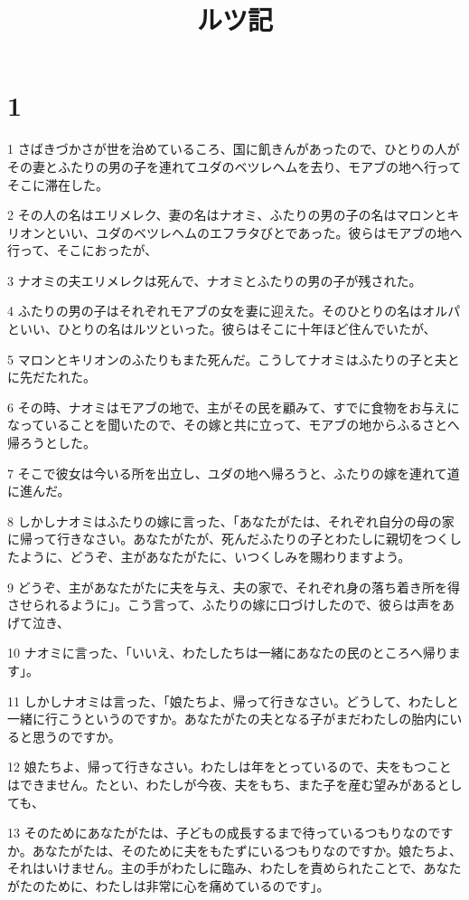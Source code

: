 

\title{ルツ記}


\chapter{1}

\par 1 さばきづかさが世を治めているころ、国に飢きんがあったので、ひとりの人がその妻とふたりの男の子を連れてユダのベツレヘムを去り、モアブの地へ行ってそこに滞在した。
\par 2 その人の名はエリメレク、妻の名はナオミ、ふたりの男の子の名はマロンとキリオンといい、ユダのベツレヘムのエフラタびとであった。彼らはモアブの地へ行って、そこにおったが、
\par 3 ナオミの夫エリメレクは死んで、ナオミとふたりの男の子が残された。
\par 4 ふたりの男の子はそれぞれモアブの女を妻に迎えた。そのひとりの名はオルパといい、ひとりの名はルツといった。彼らはそこに十年ほど住んでいたが、
\par 5 マロンとキリオンのふたりもまた死んだ。こうしてナオミはふたりの子と夫とに先だたれた。
\par 6 その時、ナオミはモアブの地で、主がその民を顧みて、すでに食物をお与えになっていることを聞いたので、その嫁と共に立って、モアブの地からふるさとへ帰ろうとした。
\par 7 そこで彼女は今いる所を出立し、ユダの地へ帰ろうと、ふたりの嫁を連れて道に進んだ。
\par 8 しかしナオミはふたりの嫁に言った、「あなたがたは、それぞれ自分の母の家に帰って行きなさい。あなたがたが、死んだふたりの子とわたしに親切をつくしたように、どうぞ、主があなたがたに、いつくしみを賜わりますよう。
\par 9 どうぞ、主があなたがたに夫を与え、夫の家で、それぞれ身の落ち着き所を得させられるように」。こう言って、ふたりの嫁に口づけしたので、彼らは声をあげて泣き、
\par 10 ナオミに言った、「いいえ、わたしたちは一緒にあなたの民のところへ帰ります」。
\par 11 しかしナオミは言った、「娘たちよ、帰って行きなさい。どうして、わたしと一緒に行こうというのですか。あなたがたの夫となる子がまだわたしの胎内にいると思うのですか。
\par 12 娘たちよ、帰って行きなさい。わたしは年をとっているので、夫をもつことはできません。たとい、わたしが今夜、夫をもち、また子を産む望みがあるとしても、
\par 13 そのためにあなたがたは、子どもの成長するまで待っているつもりなのですか。あなたがたは、そのために夫をもたずにいるつもりなのですか。娘たちよ、それはいけません。主の手がわたしに臨み、わたしを責められたことで、あなたがたのために、わたしは非常に心を痛めているのです」。
